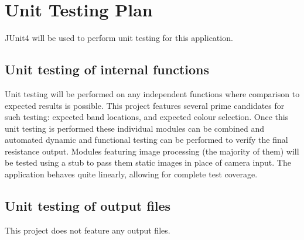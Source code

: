 \documentclass[12pt, titlepage]{article}
\begin{document}
\section{Unit Testing Plan}	
\par JUnit4 will be used to perform unit testing for this application.	
\subsection{Unit testing of internal functions}
\par Unit testing will be performed on any independent functions where comparison to expected results is possible. This project features several prime candidates for such testing: expected band locations, and expected colour selection. Once this unit testing is performed these individual modules can be combined and automated dynamic and functional testing can be performed to verify the final resistance output. Modules featuring image processing (the majority of them) will be tested using a stub to pass them static images in place of camera input. The application behaves quite linearly, allowing for complete test coverage.
\subsection{Unit testing of output files}		
\par This project does not feature any output files.


\end{document}
